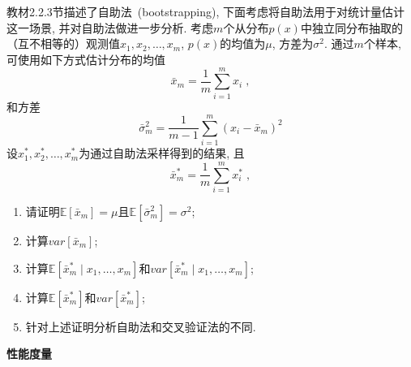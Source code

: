 \documentclass[answers]{exam}  %
\begin{document}
\begin{questions}
  教材2.2.3节描述了自助法~(bootstrapping), 下面考虑将自助法用于对统计量估计这一场景, 并对自助法做进一步分析.
  考虑$m$个从分布$p(x)$中独立同分布抽取的（互不相等的）观测值$x_1, x_2, \ldots, x_m$, $p(x)$的均值为$\mu$, 方差为$\sigma^2$. 通过$m$个样本, 可使用如下方式估计分布的均值
  \begin{equation}
    \bar{x}_m = \frac{1}{m} \sum_{i=1}^{m} x_{i}\;,\label{ch2_eq:estimate_mean}
  \end{equation}
  和方差
  \begin{equation}
    \bar{\sigma}^2_m=\frac{1}{m-1} \sum_{i=1}^{m}\left(x_{i}-\bar{x}_m\right)^{2}\label{ch2_eq:estimate_variance}
  \end{equation}
  设$x^*_1, x^*_2, \ldots, x^*_m$为通过自助法采样得到的结果, 且
  \begin{equation}
    \bar{x}^*_m = \frac{1}{m} \sum_{i=1}^{m} x^*_{i}\;,
  \end{equation}
  \begin{enumerate}
    \item 请证明$\mathbb E[\bar{x}_m] = \mu$且$\mathbb E[\bar{\sigma}^2_m] = \sigma^2$;
    \item 计算$var[\bar{x}_m]$;
    \item 计算$\mathbb E[\bar{x}^*_m \mid x_1, \ldots, x_m]$和$var[\bar{x}^*_m \mid x_1, \ldots, x_m]$;
    \item 计算$\mathbb E[\bar{x}^*_m]$和$var[\bar{x}^*_m]$;
    \item 针对上述证明分析自助法和交叉验证法的不同.
  \end{enumerate}

  \begin{solution}
  \end{solution}


  \question [30] \textbf{性能度量}


\end{questions}
\end{document}
